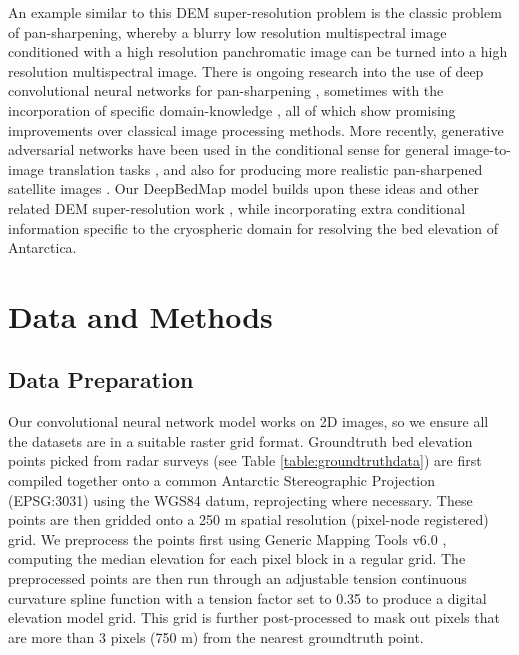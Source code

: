 \documentclass[tc, manuscript]{copernicus}
\begin{document}
An example similar to this DEM super-resolution problem is the classic problem of pan-sharpening, whereby a blurry low resolution multispectral image conditioned with a high resolution panchromatic image can be turned into a high resolution multispectral image.
There is ongoing research into the use of deep convolutional neural networks for pan-sharpening \citep{MasiPansharpeningConvolutionalNeural2016,ScarpaTargetAdaptiveCNNBasedPansharpening2018}, sometimes with the incorporation of specific domain-knowledge \citep{YangPanNetDeepNetwork2017}, all of which show promising improvements over classical image processing methods.
More recently, generative adversarial networks \citep{GoodfellowGenerativeAdversarialNetworks2014} have been used in the conditional sense for general image-to-image translation tasks \citep[e.g.][]{IsolaImagetoImageTranslationConditional2016,ParkSemanticImageSynthesis2019}, and also for producing more realistic pan-sharpened satellite images \citep{LiuPSGANGenerativeAdversarial2018}.
Our DeepBedMap model builds upon these ideas and other related DEM super-resolution work \citep{XuNonlocalsimilaritybased2015,ChenConvolutionalNeuralNetwork2016}, while incorporating extra conditional information specific to the cryospheric domain for resolving the bed elevation of Antarctica.


\section{Data and Methods}

\subsection{Data Preparation} \label{section:datapreparation}

Our convolutional neural network model works on 2D images, so we ensure all the datasets are in a suitable raster grid format.
Groundtruth bed elevation points picked from radar surveys (see Table \ref{table:groundtruthdata}) are first compiled together onto a common Antarctic Stereographic Projection (EPSG:3031) using the WGS84 datum, reprojecting where necessary.
These points are then gridded onto a 250 m spatial resolution (pixel-node registered) grid.
We preprocess the points first using Generic Mapping Tools v6.0 \citep[GMT6,][]{WesselGenericMappingTools2019}, computing the median elevation for each pixel block in a regular grid.
The preprocessed points are then run through an adjustable tension continuous curvature spline function with a tension factor set to 0.35 to produce a digital elevation model grid.
This grid is further post-processed to mask out pixels that are more than 3 pixels (750 m) from the nearest groundtruth point.
\end{document}
